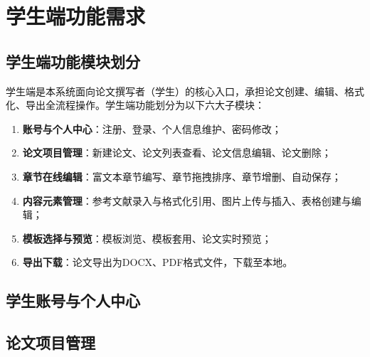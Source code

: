 
\section{学生端功能需求}

\subsection{学生端功能模块划分}

学生端是本系统面向论文撰写者（学生）的核心入口，承担论文创建、编辑、格式化、导出全流程操作。学生端功能划分为以下六大子模块：

\begin{enumerate}
    \item \textbf{账号与个人中心}：注册、登录、个人信息维护、密码修改；
    \item \textbf{论文项目管理}：新建论文、论文列表查看、论文信息编辑、论文删除；
    \item \textbf{章节在线编辑}：富文本章节编写、章节拖拽排序、章节增删、自动保存；
    \item \textbf{内容元素管理}：参考文献录入与格式化引用、图片上传与插入、表格创建与编辑；
    \item \textbf{模板选择与预览}：模板浏览、模板套用、论文实时预览；
    \item \textbf{导出下载}：论文导出为DOCX、PDF格式文件，下载至本地。
\end{enumerate}

\subsection{学生账号与个人中心}


\subsection{论文项目管理}

